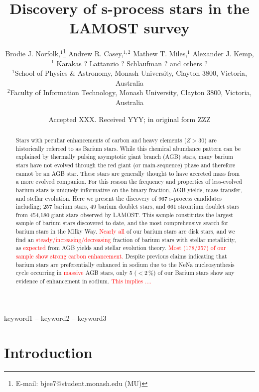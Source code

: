 \documentclass[a4paper,fleqn,usenatbib]{mnras}
\title[S-process stars in LAMOST]{Discovery of s-process stars in the LAMOST survey}
\author[B. J. Norfolk et al.]{Brodie J. Norfolk,$^{1}$\thanks{E-mail: bjee7@student.monash.edu (MU)}
Andrew R. Casey,$^{1,2}$
Mathew T. Miles,$^{1}$
Alexander J. Kemp,$^{1}$ \newauthor
Karakas ? Lattanzio ? Schlaufman ? and others ?
\\
$^{1}$School of Physics \& Astronomy, Monash University, Clayton 3800, Victoria, Australia\\
$^{2}$Faculty of Information Technology, Monash University, Clayton 3800, Victoria, Australia\\
}
\date{Accepted XXX. Received YYY; in original form ZZZ}
\newcommand{\todo}[1]{\textcolor{red}{#1}}
\begin{document}
\label{firstpage}
\pagerange{\pageref{firstpage}--\pageref{lastpage}}
\maketitle

\begin{abstract}
Stars with peculiar enhancements of carbon and heavy elements ($Z > 30$) are historically referred to as Barium stars. While this chemical abundance pattern can be explained by thermally pulsing asymptotic giant branch (AGB) stars, many barium stars have not evolved through the red giant (or main-sequence) phase and therefore cannot be an AGB star. These stars are generally thought to have accreted mass from a more evolved companion. For this reason the frequency and properties of less-evolved barium stars is uniquely informative on the binary fraction, AGB yields, mass transfer, and stellar evolution. Here we present the discovery of 967 s-process candidates including; 257 barium stars, 49 barium doublet stars, and 661 strontium doublet stars from 454,180 giant stars observed by LAMOST. This sample constitutes the largest sample of barium stars discovered to date, and the most comprehensive search for barium stars in the Milky Way. \todo{Nearly all} of our barium stars are disk stars, and we find an \todo{steady/increasing/decreasing} fraction of barium stars with stellar metallicity, as \todo{expected} from AGB yields and stellar evolution theory.  
\todo{Most (178/257) of our sample show strong carbon enhancement.}
Despite previous claims indicating that barium stars are preferentially enhanced in sodium due to the NeNa nucleosynthesis cycle occurring in \todo{massive} AGB stars, only 5 ($<2$\,\%) of our Barium stars show any evidence of enhancement in sodium. \todo{This implies ....}
\end{abstract}

\begin{keywords}
keyword1 -- keyword2 -- keyword3
\end{keywords}

\section{Introduction} \label{sec:intro}
\end{document}
